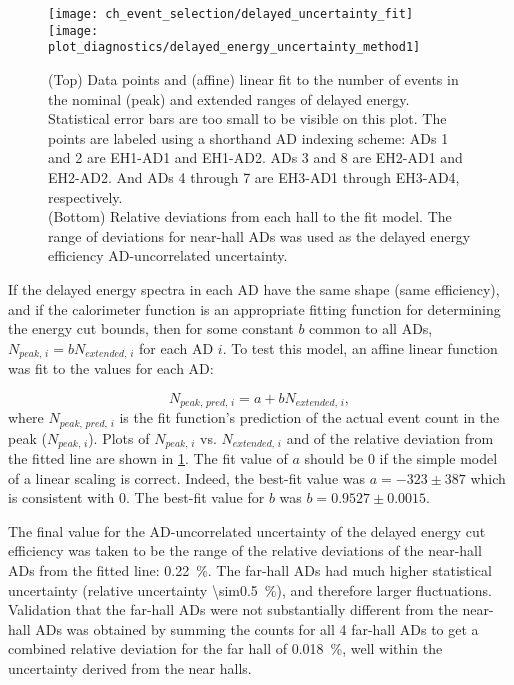 \begin{figure}
    \centering
    \texttt{[image: ch\_event\_selection/delayed\_uncertainty\_fit]}\\
    \texttt{[image: plot\_diagnostics/delayed\_energy\_uncertainty\_method1]}
    \caption[Delayed energy efficiency uncertainty]{
        (Top) Data points and (affine) linear fit
        to the number of events in the nominal (peak)
        and extended ranges of delayed energy.
        Statistical error bars are too small to be visible on this plot.
        The points are labeled using a shorthand AD indexing scheme:
        ADs 1 and 2 are EH1-AD1 and EH1-AD2. ADs 3 and 8 are EH2-AD1 and EH2-AD2.
        And ADs 4 through 7 are EH3-AD1 through EH3-AD4, respectively.\\
        (Bottom) Relative deviations from each hall to the fit model.
        The range of deviations for near-hall ADs
        was used as the delayed energy efficiency AD-uncorrelated uncertainty.
    }
    \label{fig:delayed_eff_unc_fit}
\end{figure}


If the delayed energy spectra in each AD have the same shape (same efficiency),
and if the calorimeter function is an appropriate fitting function
for determining the energy cut bounds,
then for some constant $b$ common to all ADs,
$N_{peak,\,i} = b N_{extended,\,i}$ for each AD $i$.
To test this model, an affine linear function was fit
to the values for each AD:

\begin{equation}
    N_{peak,\,pred,\,i} = a + b N_{extended,\,i},
\end{equation}
where $N_{peak,\,pred,\,i}$ is the fit function's prediction
of the actual event count in the peak ($N_{peak,\,i}$).
Plots of $N_{peak,\,i}$ vs. $N_{extended,\,i}$ and of the
relative deviation from the fitted line are shown in \cref{fig:delayed_eff_unc_fit}.
The fit value of $a$ should be $0$ if the simple model of
a linear scaling is correct.
Indeed, the best-fit value was $a = -323 \pm 387$
which is consistent with $0$.
The best-fit value for $b$ was $b = 0.9527 \pm 0.0015$.

The final value for the AD-uncorrelated uncertainty
of the delayed energy cut efficiency was taken to be
the range of the relative deviations
of the near-hall ADs from the fitted line: \SI{0.22}{\percent}.
The far-hall ADs had much higher statistical uncertainty
(relative uncertainty \SI{\sim0.5}{\percent}),
and therefore larger fluctuations.
Validation that the far-hall ADs were not
substantially different from the near-hall ADs was obtained by
summing the counts for all 4 far-hall ADs to get
a combined relative deviation for the far hall of \SI{0.018}{\percent},
well within the uncertainty derived from the near halls.

